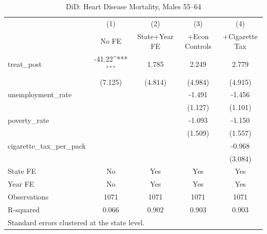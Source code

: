 \begin{table}[htbp]\centering
\def\sym#1{\ifmmode^{#1}\else\(^{#1}\)\fi}
\caption{DiD: Heart Disease Mortality, Males 55--64}
\begin{tabular}{l*{4}{c}}
\toprule
                    &\multicolumn{1}{c}{(1)}&\multicolumn{1}{c}{(2)}&\multicolumn{1}{c}{(3)}&\multicolumn{1}{c}{(4)}\\
                    &\multicolumn{1}{c}{No FE}&\multicolumn{1}{c}{State+Year FE}&\multicolumn{1}{c}{+Econ Controls}&\multicolumn{1}{c}{+Cigarette Tax}\\
\midrule
treat\_post          &      -41.22\sym{***}&       1.785         &       2.249         &       2.779         \\
                    &     (7.125)         &     (4.814)         &     (4.984)         &     (4.915)         \\
\addlinespace
unemployment\_rate   &                     &                     &      -1.491         &      -1.456         \\
                    &                     &                     &     (1.127)         &     (1.101)         \\
\addlinespace
poverty\_rate        &                     &                     &      -1.093         &      -1.150         \\
                    &                     &                     &     (1.509)         &     (1.557)         \\
\addlinespace
cigarette\_tax\_per\_pack&                     &                     &                     &      -0.968         \\
                    &                     &                     &                     &     (3.084)         \\
\midrule
State FE            &          No         &         Yes         &         Yes         &         Yes         \\
Year FE             &          No         &         Yes         &         Yes         &         Yes         \\
Observations        &        1071         &        1071         &        1071         &        1071         \\
R-squared           &       0.066         &       0.902         &       0.903         &       0.903         \\
\bottomrule
\multicolumn{5}{l}{\footnotesize Standard errors clustered at the state level.}\\
\end{tabular}
\end{table}
